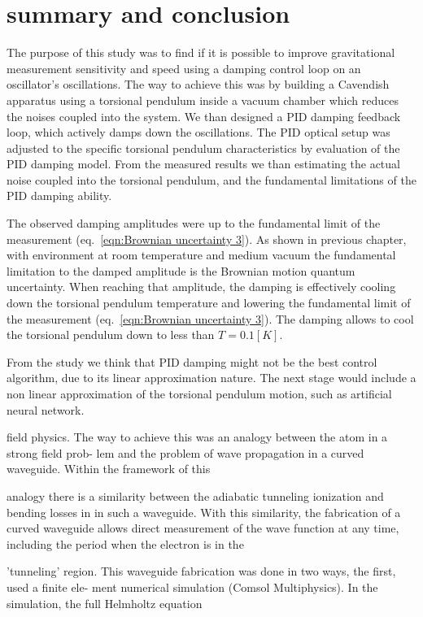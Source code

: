 \documentclass[\main/master.tex]{subfiles}
\begin{document}
\chapter{summary and conclusion}\label{chp:summary and conclusion}
The purpose of this study was to find if it is possible to improve gravitational measurement sensitivity and speed using a damping control loop on an oscillator's oscillations. The way to achieve this was by building a Cavendish apparatus using a torsional pendulum inside a vacuum chamber which reduces the noises coupled into the system. We than designed a PID damping feedback loop, which actively damps down the oscillations. The PID optical setup was adjusted to the specific torsional pendulum characteristics by evaluation of the PID damping model. From the measured results we than estimating the actual noise coupled into the torsional pendulum, and the fundamental limitations of the PID damping ability.
\par\noindent
The observed damping amplitudes were up to the fundamental limit of the measurement (eq.~\ref{eqn:Brownian uncertainty 3}). As shown in previous chapter, with environment at room temperature and medium vacuum the fundamental limitation to the damped amplitude is the Brownian motion quantum uncertainty. When reaching that amplitude, the damping is effectively cooling down the torsional pendulum temperature and lowering the fundamental limit of the measurement (eq.~\ref{eqn:Brownian uncertainty 3}). The damping allows to cool the torsional pendulum down to less than $T=0.1[K]$.
\par\noindent
From the study we think that PID damping might not be the best control algorithm, due to its linear approximation nature. The next stage would include a non linear approximation of the torsional pendulum motion, such as artificial neural network. 


field physics. The way to achieve this was an analogy between the atom in a strong field prob-
lem and the problem of wave propagation in a curved waveguide. Within the framework of this

analogy there is a similarity between the adiabatic tunneling ionization and bending losses in
in such a waveguide. With this similarity, the fabrication of a curved waveguide allows direct
measurement of the wave function at any time, including the period when the electron is in the

’tunneling’ region. This waveguide fabrication was done in two ways, the first, used a finite ele-
ment numerical simulation (Comsol Multiphysics). In the simulation, the full Helmholtz equation
\end{document}
